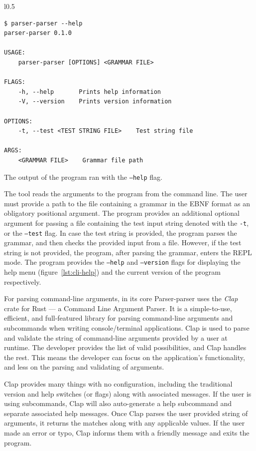 \documentclass[english,engineering]{wizthesis}
\newcommand{\thisproject}{Parser-parser}
\begin{document}
\begin{wraplisting}{l}{0.5\textwidth}
  \begin{verbatim}
$ parser-parser --help
parser-parser 0.1.0

USAGE:
    parser-parser [OPTIONS] <GRAMMAR FILE>

FLAGS:
    -h, --help       Prints help information
    -V, --version    Prints version information

OPTIONS:
    -t, --test <TEST STRING FILE>    Test string file

ARGS:
    <GRAMMAR FILE>    Grammar file path
  \end{verbatim}
  \caption{The output of the program ran with the \texttt{--help} flag.}
  \label{lst:cli-help}
\end{wraplisting}

The tool reads the arguments to the program from the command line. The user must
provide a path to the file containing a grammar in the EBNF format as an
obligatory positional argument. The program provides an additional optional
argument for passing a file containing the test input string denoted with the
\texttt{-t}, or the \texttt{--test} flag. In case the test string is provided,
the program parses the grammar, and then checks the provided input from a file.
However, if the test string is not provided, the program, after parsing the
grammar, enters the REPL mode. The program provides the \texttt{--help} and
\texttt{--version} flags for displaying the help menu
(figure~\ref{lst:cli-help}) and the current version of the program respectively.

For parsing command-line arguments, in its core \thisproject{} uses the
\emph{Clap} crate for Rust --- a Command Line Argument Parser. It is a
simple-to-use, efficient, and full-featured library for parsing command-line
arguments and subcommands when writing console/terminal applications. Clap is
used to parse and validate the string of command-line arguments provided by a
user at runtime. The developer provides the list of valid possibilities, and
Clap handles the rest. This means the developer can focus on the application's
functionality, and less on the parsing and validating of arguments.

Clap provides many things with no configuration, including the traditional
version and help switches (or flags) along with associated messages. If the user
is using subcommands, Clap will also auto-generate a help subcommand and
separate associated help messages. Once Clap parses the user provided string of
arguments, it returns the matches along with any applicable values. If the user
made an error or typo, Clap informs them with a friendly message and exits
the program.
\end{document}
